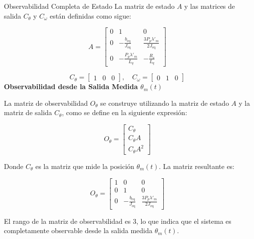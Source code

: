\documentclass[12pt]{beamer}
\begin{document}
\begin{frame}{Observabilidad Completa de Estado}\scriptsize
La matriz de estado \( A \) y las matrices de salida \( C_{\theta} \) y \( C_{\omega} \) están definidas como sigue:

\[
A = \begin{bmatrix}
0 & 1 & 0 \\
0 & -\frac{b_{\text{eq}}}{J_{\text{eq}}} & \frac{3 P_{p} \lambda'_{m}}{2 J_{\text{eq}}} \\
0 & -\frac{P_{p} \lambda'_{m}}{L_q} & -\frac{R_s}{L_q}
\end{bmatrix}
\]

\[
C_{\theta} = \begin{bmatrix}
1 & 0 & 0
\end{bmatrix}, \quad
C_{\omega} = \begin{bmatrix}
0 & 1 & 0
\end{bmatrix}
\]
\textbf{Observabilidad desde la Salida Medida $\theta_m(t)$}

La matriz de observabilidad \( O_{\theta} \) se construye utilizando la matriz de estado \( A \) y la matriz de salida \( C_{\theta} \), como se define en la siguiente expresión:

\[
O_{\theta} = \begin{bmatrix}
C_{\theta} \\
C_{\theta} A \\
C_{\theta} A^2
\end{bmatrix}
\]

Donde \( C_{\theta} \) es la matriz que mide la posición \(\theta_m(t)\). La matriz resultante es:

\[
O_{\theta} = \begin{bmatrix}
1 & 0 & 0 \\
0 & 1 & 0 \\
0 & -\frac{b_{\text{eq}}}{J_{\text{eq}}} & \frac{3 P_{p} \lambda'_{m}}{2 J_{\text{eq}}}
\end{bmatrix}
\]

El rango de la matriz de observabilidad es 3, lo que indica que el sistema es completamente observable desde la salida medida \(\theta_m(t)\).
    
\end{frame}
\end{document}
